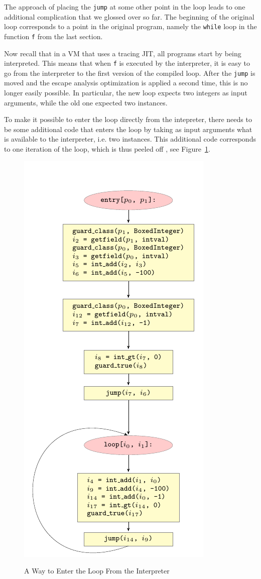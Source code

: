 \documentclass{sigplanconf}
\let\oldcite=\cite
\renewcommand\cite[1]{\ifthenelse{\equal{#1}{XXX}}{[citation~needed]}{\oldcite{#1}}}
\begin{document}
The approach of placing the \texttt{jump} at some other point in the loop leads to
one additional complication that we glossed over so far. The beginning of the
original loop corresponds to a point in the original program, namely the
\texttt{while} loop in the function \texttt{f} from the last section.

Now recall that in a VM that uses a tracing JIT, all programs start by being
interpreted. This means that when \texttt{f} is executed by the interpreter, it is
easy to go from the interpreter to the first version of the compiled loop.
After the \texttt{jump} is moved and the escape analysis optimization is applied a
second time, this is no longer easily possible.  In particular, the new loop
expects two integers as input arguments, while the old one expected two
instances.

To make it possible to enter the loop directly from the intepreter, there
needs to be some additional code that enters the loop by taking as input
arguments what is available to the interpreter, i.e. two instances. This
additional code corresponds to one iteration of the loop, which is thus
peeled off \cite{XXX}, see Figure~\ref{fig:step3}.

\begin{figure}
\includegraphics{figures/step4.pdf}
\label{fig:step3}
\caption{A Way to Enter the Loop From the Interpreter}
\end{figure}
\end{document}
